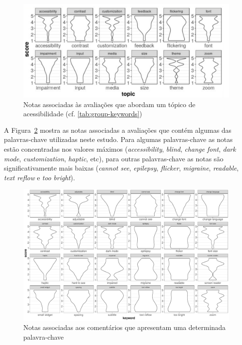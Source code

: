 \begin{figure}[!htb]
\centering
\includegraphics[scale=0.57]{imagens/score-themes-adapt.pdf}
\caption{Notas associadas às avaliações que abordam um tópico de acessibilidade (cf. \autoref{tab:group-keywords})}
\label{fig:scoresthemes}
\end{figure}

A Figura~\ref{fig:scoreskeys} mostra as notas associadas a avaliações que contém algumas das palavras-chave utilizadas neste estudo. 
Para algumas palavras-chave as notas estão concentradas nos valores máximos (\textit{accessibility}, \textit{blind}, \textit{change font}, \textit{dark mode}, \textit{customization}, \textit{haptic}, etc), para outras palavras-chave as notas são significativamente mais baixas (\textit{cannot see}, \textit{epilepsy}, \textit{flicker}, \textit{migraine}, \textit{readable}, \textit{text reflow} e \textit{too bright}). 

\begin{figure}[!htb]
\centering
\includegraphics[scale=0.42]{imagens/keywords-scores.pdf}
\caption{Notas associadas aos comentários que apresentam uma determinada palavra-chave}
\label{fig:scoreskeys}
\end{figure}

